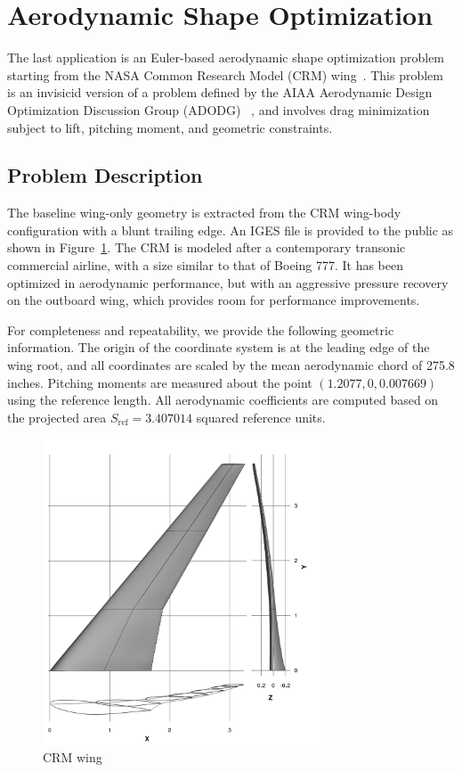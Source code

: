 \newpage
\section{Aerodynamic Shape Optimization}

The last application is an Euler-based aerodynamic shape optimization problem starting from the NASA Common Research Model (CRM) wing~\cite{crm_wing}. This problem is an invisicid version of a problem defined by
the AIAA Aerodynamic Design Optimization Discussion Group (ADODG) ~\cite{adodg}, and involves drag minimization subject to lift, pitching moment, and geometric constraints.   

\subsection{Problem Description}
The baseline wing-only geometry is extracted from the CRM wing-body configuration with a blunt trailing edge. An IGES file is provided to the public as shown in Figure~\ref{fig:crm_wing}. The CRM is modeled after a contemporary transonic commercial airline, with a size similar to that of Boeing 777. It has been optimized in aerodynamic performance, but with an aggressive pressure recovery on the outboard wing, which provides room for performance improvements. 

For completeness and repeatability, we provide the following geometric information. 
The origin of the coordinate system is at the leading edge of the wing root, and all coordinates are scaled by the mean aerodynamic chord of 275.8 inches. Pitching moments are measured about the point $(1.2077, 0, 0.007669)$ using the reference length. All aerodynamic coefficients are computed based on the projected area $S_{\text{ref}}=3.407014$ squared reference units. 

\begin{figure}[tbp]
  \centering
  \includegraphics[clip,width=0.75\textwidth]{./figs/chap7_aso/CRM-wing.png}%
  \caption{CRM wing \label{fig:crm_wing}}
\end{figure}


